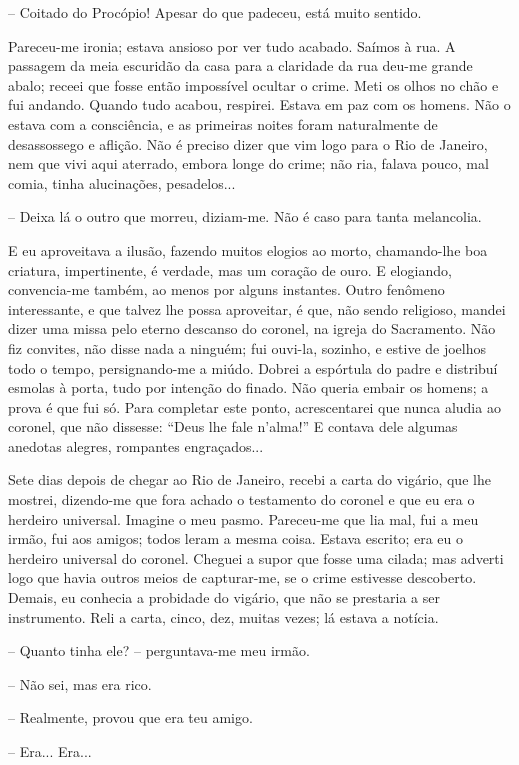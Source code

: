 -- Coitado do Procópio! Apesar do que padeceu, está muito sentido.

Pareceu-me ironia; estava ansioso por ver tudo acabado. Saímos à rua. A
passagem da meia escuridão da casa para a claridade da rua deu-me grande
abalo; receei que fosse então impossível ocultar o crime. Meti os olhos
no chão e fui andando. Quando tudo acabou, respirei. Estava em paz com
os homens. Não o estava com a consciência, e as primeiras noites foram
naturalmente de desassossego e aflição. Não é preciso dizer que vim logo
para o Rio de Janeiro, nem que vivi aqui aterrado, embora longe do
crime; não ria, falava pouco, mal comia, tinha alucinações, pesadelos...

-- Deixa lá o outro que morreu, diziam-me. Não é caso para tanta
melancolia.

E eu aproveitava a ilusão, fazendo muitos elogios ao morto, chamando-lhe
boa criatura, impertinente, é verdade, mas um coração de ouro. E
elogiando, convencia-me também, ao menos por alguns instantes. Outro
fenômeno interessante, e que talvez lhe possa aproveitar, é que, não
sendo religioso, mandei dizer uma missa pelo eterno descanso do coronel,
na igreja do Sacramento. Não fiz convites, não disse nada a ninguém; fui
ouvi-la, sozinho, e estive de joelhos todo o tempo, persignando-me a
miúdo. Dobrei a espórtula do padre e distribuí esmolas à porta, tudo por
intenção do finado. Não queria embair os homens; a prova é que fui só.
Para completar este ponto, acrescentarei que nunca aludia ao coronel,
que não dissesse: ``Deus lhe fale n'alma!'' E contava dele algumas
anedotas alegres, rompantes engraçados...

Sete dias depois de chegar ao Rio de Janeiro, recebi a carta do vigário,
que lhe mostrei, dizendo-me que fora achado o testamento do coronel e
que eu era o herdeiro universal. Imagine o meu pasmo. Pareceu-me que lia
mal, fui a meu irmão, fui aos amigos; todos leram a mesma coisa. Estava
escrito; era eu o herdeiro universal do coronel. Cheguei a supor que
fosse uma cilada; mas adverti logo que havia outros meios de
capturar-me, se o crime estivesse descoberto. Demais, eu conhecia a
probidade do vigário, que não se prestaria a ser instrumento. Reli a
carta, cinco, dez, muitas vezes; lá estava a notícia.

-- Quanto tinha ele? -- perguntava-me meu irmão.

-- Não sei, mas era rico.

-- Realmente, provou que era teu amigo.

-- Era... Era...

